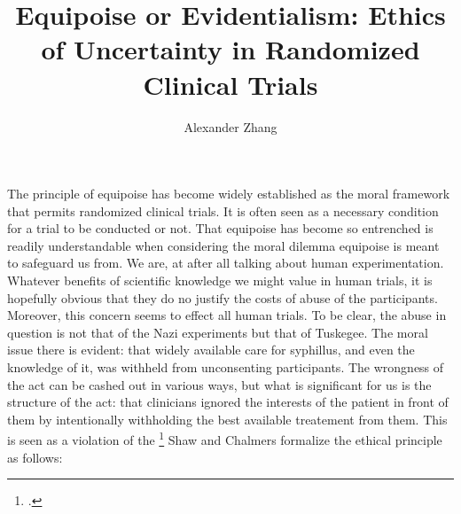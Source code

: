 \documentclass[letterpaper,notitlepage,12pt]{article}
\title{Equipoise or Evidentialism: Ethics of Uncertainty in Randomized Clinical
Trials}
\author{Alexander Zhang}
\date{}
\begin{document}
\maketitle

The principle of equipoise has become widely established as the moral framework
that permits randomized clinical trials.
It is often seen as a necessary condition for a trial to be conducted or not.
That equipoise has become so entrenched is readily understandable when
considering the moral dilemma equipoise is meant to safeguard us from. We are,
at after all talking about human experimentation.
Whatever benefits of scientific knowledge we might value in human trials, it is
hopefully obvious that they do no justify the costs of abuse of the
participants.
Moreover, this concern seems to effect all human trials.
To be clear, the abuse in question is not that of the Nazi experiments but that
of Tuskegee.
The moral issue there is evident: that widely available care for syphillus, and
even the knowledge of it, was withheld from unconsenting participants.
The wrongness of the act can be cashed out in various ways, but what is
significant for us is the structure of the act: that clinicians ignored the
interests of the patient in front of them by intentionally withholding the best
available treatement from them.
This is seen as a violation of the \footcite[p. 487]{shaw_ethics_1970}
Shaw and Chalmers formalize the ethical principle as follows:
\end{document}

